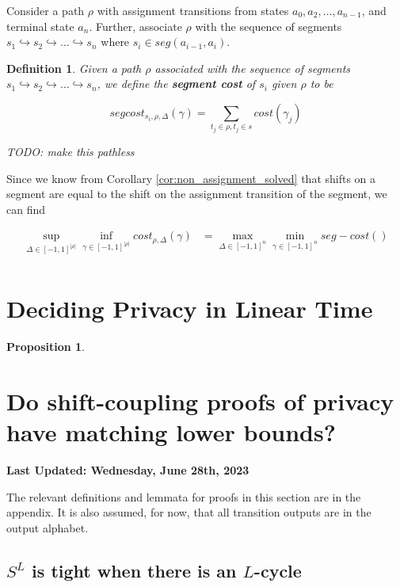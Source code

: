 \documentclass{article}
\newtheorem{proposition}{Proposition}[section]
\newtheorem{definition}{Definition}[section]
\newcommand{\1}{\langle 1 \rangle}
\newcommand{\2}{\langle 2 \rangle}
\begin{document}
Consider a path $\rho$ with assignment transitions from states $a_0, a_2, \dots, a_{n - 1}$, and terminal state $a_n$. Further, associate $\rho$ with the sequence of segments $s_1 \hookrightarrow s_2 \hookrightarrow \dots \hookrightarrow s_n$ where $s_i \in seg(a_{i - 1}, a_i)$.

\begin{definition}
    Given a path $\rho$ associated with the sequence of segments $s_1 \hookrightarrow s_2 \hookrightarrow \dots \hookrightarrow s_n$, we define the \textbf{segment cost} of $s_i$ given $\rho$ to be 

    \[segcost_{s_i, \rho, \Delta}(\gamma) = \sum_{t_j \in \rho, t_j \in s} cost(\gamma_j) \]

    TODO: make this pathless
\end{definition}

Since we know from Corollary \ref{cor:non_assignment_solved} that shifts on a segment are equal to the shift on the assignment transition of the segment, we can find

\begin{align*}
    \sup_{\Delta \in [-1, 1]^{|\rho|}} \inf_{\gamma \in [-1, 1]^{|\rho|}} cost_{\rho, \Delta} (\gamma) &= \max_{\Delta \in [-1, 1]^{n}} \min_{\gamma \in [-1, 1]^{n}} seg-cost()\\
\end{align*}

\section{Deciding Privacy in Linear Time}

\begin{proposition}
    
\end{proposition}

\section{Do shift-coupling proofs of privacy have matching lower bounds?}
\textbf{Last Updated: Wednesday, June 28th, 2023}

The relevant definitions and lemmata for proofs in this section are in the appendix. It is also assumed, for now, that all transition outputs are in the output alphabet. 

\subsection{$S^L$ is tight when there is an $L$-cycle}
\end{document}
